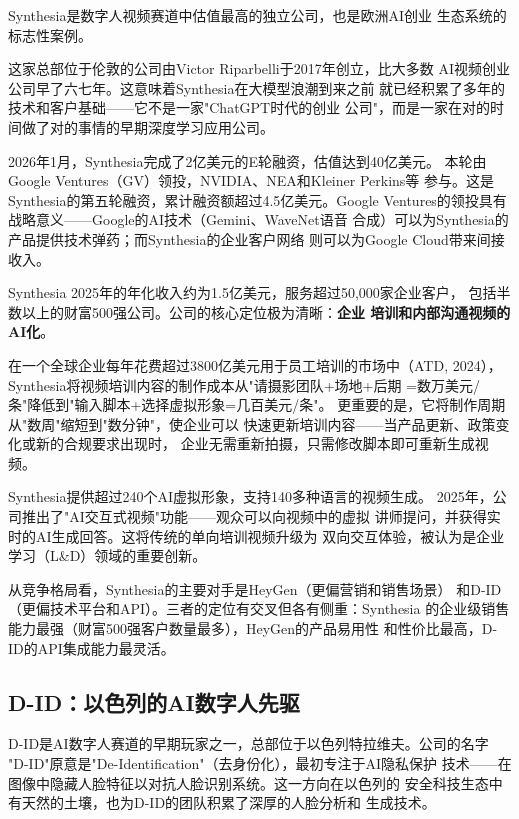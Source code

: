 Synthesia是数字人视频赛道中估值最高的独立公司，也是欧洲AI创业
生态系统的标志性案例。

这家总部位于伦敦的公司由Victor Riparbelli于2017年创立，比大多数
AI视频创业公司早了六七年。这意味着Synthesia在大模型浪潮到来之前
就已经积累了多年的技术和客户基础——它不是一家"ChatGPT时代的创业
公司"，而是一家在对的时间做了对的事情的早期深度学习应用公司。

2026年1月，Synthesia完成了2亿美元的E轮融资，估值达到40亿美元。
本轮由Google Ventures（GV）领投，NVIDIA、NEA和Kleiner Perkins等
参与。这是Synthesia的第五轮融资，累计融资额超过4.5亿美元。Google
Ventures的领投具有战略意义——Google的AI技术（Gemini、WaveNet语音
合成）可以为Synthesia的产品提供技术弹药；而Synthesia的企业客户网络
则可以为Google Cloud带来间接收入。

Synthesia 2025年的年化收入约为1.5亿美元，服务超过50,000家企业客户，
包括半数以上的财富500强公司。公司的核心定位极为清晰：\textbf{企业
培训和内部沟通视频的AI化}。

在一个全球企业每年花费超过3800亿美元用于员工培训的市场中（ATD,
2024），Synthesia将视频培训内容的制作成本从"请摄影团队+场地+后期
=数万美元/条"降低到"输入脚本+选择虚拟形象=几百美元/条"。
更重要的是，它将制作周期从"数周"缩短到"数分钟"，使企业可以
快速更新培训内容——当产品更新、政策变化或新的合规要求出现时，
企业无需重新拍摄，只需修改脚本即可重新生成视频。

Synthesia提供超过240个AI虚拟形象，支持140多种语言的视频生成。
2025年，公司推出了"AI交互式视频"功能——观众可以向视频中的虚拟
讲师提问，并获得实时的AI生成回答。这将传统的单向培训视频升级为
双向交互体验，被认为是企业学习（L\&D）领域的重要创新。

从竞争格局看，Synthesia的主要对手是HeyGen（更偏营销和销售场景）
和D-ID（更偏技术平台和API）。三者的定位有交叉但各有侧重：Synthesia
的企业级销售能力最强（财富500强客户数量最多），HeyGen的产品易用性
和性价比最高，D-ID的API集成能力最灵活。

\subsection{D-ID：以色列的AI数字人先驱}
\label{subsec:did}

D-ID是AI数字人赛道的早期玩家之一，总部位于以色列特拉维夫。公司的名字
"D-ID"原意是"De-Identification"（去身份化），最初专注于AI隐私保护
技术——在图像中隐藏人脸特征以对抗人脸识别系统。这一方向在以色列的
安全科技生态中有天然的土壤，也为D-ID的团队积累了深厚的人脸分析和
生成技术。

